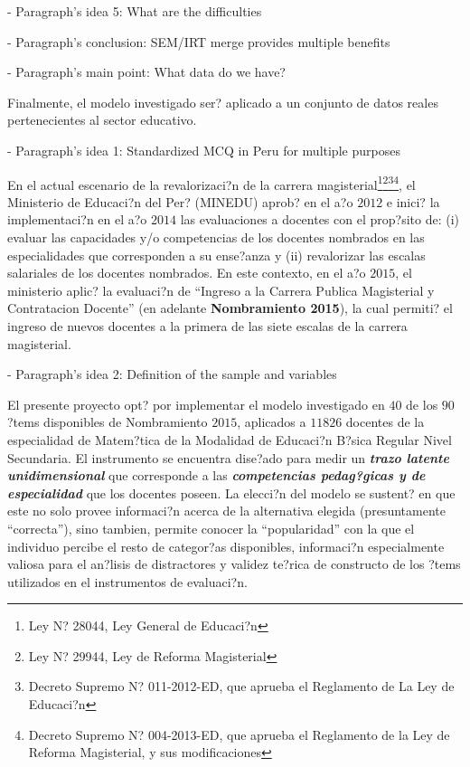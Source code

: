 - Paragraph's idea 5: What are the difficulties


- Paragraph's conclusion: SEM/IRT merge provides multiple benefits





- Paragraph's main point: What data do we have?

Finalmente, el modelo investigado ser? aplicado a un conjunto de datos reales pertenecientes al sector educativo. 


- Paragraph's idea 1: Standardized MCQ in Peru for multiple purposes

En el actual escenario de la revalorizaci?n de la carrera magisterial\footnote{Ley N? 28044, Ley General de Educaci?n}\footnote{Ley N? 29944, Ley de Reforma Magisterial}\footnote{Decreto Supremo N? 011-2012-ED, que aprueba el Reglamento de La Ley de Educaci?n}\footnote{Decreto Supremo N? 004-2013-ED, que aprueba el Reglamento de la Ley de Reforma Magisterial, y sus modificaciones}, el Ministerio de Educaci?n del Per? (MINEDU) aprob? en el a?o $2012$ e inici? la implementaci?n en el a?o $2014$ las evaluaciones a docentes con el prop?sito de: (i) evaluar las capacidades y/o competencias de los docentes nombrados en las especialidades que corresponden a su ense?anza y (ii) revalorizar las escalas salariales de los docentes nombrados. En este contexto, en el a?o $2015$, el ministerio aplic? la evaluaci?n de ``Ingreso a la Carrera Publica Magisterial y Contratacion Docente'' (en adelante \textbf{Nombramiento 2015}), la cual permiti? el ingreso de nuevos docentes a la primera de las siete escalas de la carrera magisterial.


- Paragraph's idea 2: Definition of the sample and variables

El presente proyecto opt? por implementar el modelo investigado en $40$ de los $90$ ?tems disponibles de Nombramiento $2015$, aplicados a $11826$ docentes de la especialidad de Matem?tica de la Modalidad de Educaci?n B?sica Regular Nivel Secundaria. El instrumento se encuentra dise?ado para medir un \textbf{\textit{trazo latente unidimensional}} que corresponde a las \textbf{\textit{competencias pedag?gicas y de especialidad}} que los docentes poseen. La elecci?n del modelo se sustent? en que este no solo provee informaci?n acerca de la alternativa elegida (presuntamente ``correcta''), sino tambien, permite conocer la ``popularidad'' con la que el individuo percibe el resto de categor?as disponibles, informaci?n especialmente valiosa para el an?lisis de distractores y validez te?rica de constructo de los ?tems utilizados en el instrumentos de evaluaci?n.

